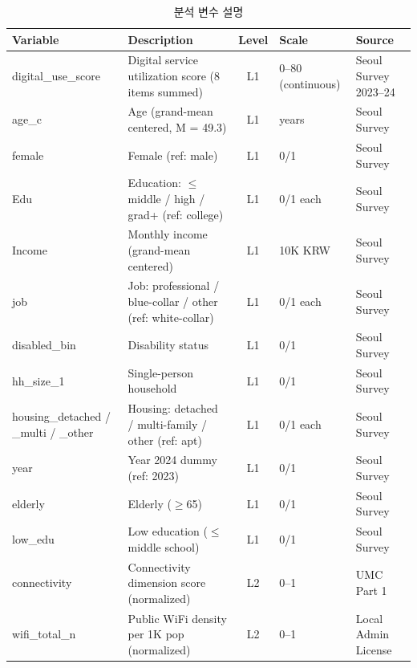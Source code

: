 \begin{table}[htbp]
  \centering\small
  \caption{분석 변수 설명}
  \label{tab:2-hlm-vars}
  \begin{tabularx}{\textwidth}{l Y c l l}
    \toprule
    \textbf{Variable} & \textbf{Description} & \textbf{Level} & \textbf{Scale} & \textbf{Source} \\
    \midrule
    digital\_use\_score & Digital service utilization score (8 items summed) & L1 & 0--80 (continuous) & Seoul Survey 2023--24 \\
    \addlinespace[2pt]
    age\_c & Age (grand-mean centered, M = 49.3) & L1 & years & Seoul Survey \\
    \addlinespace[2pt]
    female & Female (ref: male) & L1 & 0/1 & Seoul Survey \\
    \addlinespace[2pt]
    Edu & Education: $\leq$middle / high / grad+ (ref: college) & L1 & 0/1 each & Seoul Survey \\
    \addlinespace[2pt]
    Income & Monthly income (grand-mean centered) & L1 & 10K KRW & Seoul Survey \\
    \addlinespace[2pt]
    job & Job: professional / blue-collar / other (ref: white-collar) & L1 & 0/1 each & Seoul Survey \\
    \addlinespace[2pt]
    disabled\_bin & Disability status & L1 & 0/1 & Seoul Survey \\
    \addlinespace[2pt]
    hh\_size\_1 & Single-person household & L1 & 0/1 & Seoul Survey \\
    \addlinespace[2pt]
    housing\_detached / \_multi / \_other & Housing: detached / multi-family / other (ref: apt) & L1 & 0/1 each & Seoul Survey \\
    \addlinespace[2pt]
    year & Year 2024 dummy (ref: 2023) & L1 & 0/1 & Seoul Survey \\
    \addlinespace[2pt]
    elderly & Elderly ($\geq$65) & L1 & 0/1 & Seoul Survey \\
    \addlinespace[2pt]
    low\_edu & Low education ($\leq$middle school) & L1 & 0/1 & Seoul Survey \\
    \addlinespace[2pt]
    connectivity & Connectivity dimension score (normalized) & L2 & 0--1 & UMC Part 1 \\
    \addlinespace[2pt]
    wifi\_total\_n & Public WiFi density per 1K pop (normalized) & L2 & 0--1 & Local Admin License \\
    \bottomrule
  \end{tabularx}
\end{table}

